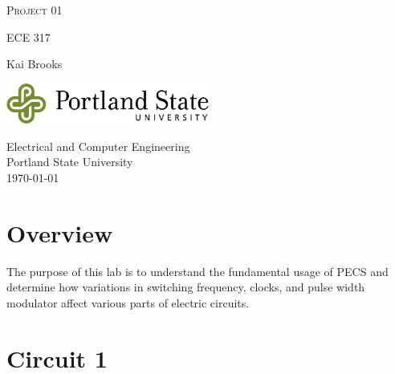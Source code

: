 \documentclass[a4paper,12pt]{article}
\begin{document}

\begin{titlepage}
	\begin{center}
		\vspace*{1cm}

		\huge\textsc{Project 01}

		\vspace{0.5cm}
		\small\textsc{ECE 317}
		
		\vspace{1.5cm}
		\normalsize Kai Brooks
		
		\vspace{0.5cm}
		
		\vfill
		\vspace{0.8cm}
		
		\includegraphics[width=0.5\textwidth]{images/psulogo_horiz_msword.tif}
		
		\vspace{0.5cm}
		Electrical and Computer Engineering\\
		Portland State University\\
		\today
		 
	\end{center}
\end{titlepage}

\newpage
\tableofcontents


\newpage
{}

\section{Overview}
The purpose of this lab is to understand the fundamental usage of PECS and determine how variations in switching frequency, clocks, and pulse width modulator affect various parts of electric circuits.

\section{Circuit 1}
\end{document}
